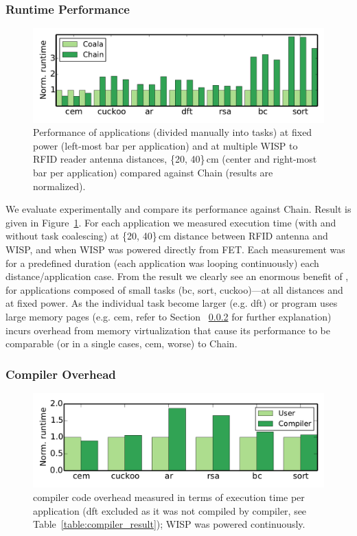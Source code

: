 \subsubsection{\sys Runtime Performance}
\label{sec:result_coalescing}

\begin{figure}
	\centering
	\includegraphics[width=\columnwidth]{figures/coala_chain_clang}
	\caption{Performance of \sys applications (divided manually into tasks) at fixed power (left-most bar per application) and at multiple WISP to RFID reader antenna distances, \{20, 40\}\,cm (center and right-most bar per application) compared against Chain (results are normalized).}
	\label{fig:runtime}
\end{figure}

We evaluate \sys experimentally and compare its performance against Chain. Result is given in Figure~\ref{fig:runtime}. For each application we measured execution time (with and without task coalescing) at \{20, 40\}\,cm distance between RFID antenna and WISP, and when WISP was powered directly from FET. Each measurement was for a predefined duration (each application was looping continuously) each distance/application case. From the result we clearly see an enormous benefit of \sys, for applications composed of small tasks (bc, sort, cuckoo)---at all distances and at fixed power. As the individual task become larger (e.g. dft) or program uses large memory pages (e.g. cem, refer to Section~
\ref{sec:result_compiler_time} for further explanation) \sys incurs overhead from memory virtualization that cause its performance to be comparable (or in a single cases, cem, worse) to Chain. 

\subsubsection{\sys Compiler Overhead}
\label{sec:result_compiler_time}

\begin{figure}
	\centering
	\includegraphics[width=\columnwidth]{figures/comp_user}
	\caption{\sys compiler code overhead measured in terms of execution time per application (dft excluded as it was not compiled by \sys compiler, see Table~\ref{table:compiler_result}); WISP was powered continuously.}
	\label{fig:comp_user}
\end{figure}

